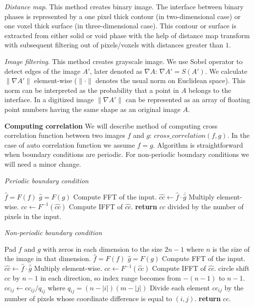 \documentclass[reprint,amsmath,amssymb,aps,pre]{revtex4-1}
\begin{document}
\textit{Distance map}.
This method creates binary image. 
The interface between binary phases is represented by a one
pixel thick contour (in two-dimensional case) or one voxel thick surface (in
three-dimensional case). This contour or surface is extracted from either solid
or void phase with the help of distance map transform with subsequent filtering
out of pixels/voxels with distances greater than $1$.

\textit{Image filtering}.
This method creates grayscale image. We use Sobel operator to detect edges of
the image $A'$, later denoted as $\nabla A$: $\nabla A' = S(A')$. We calculate
$\|\nabla A'\|$ element-wise ($\|\cdot\|$ denotes the usual norm on Euclidean
space). This norm can be interpreted as the probability that a point in $A$
belongs to the interface. In a digitized image $\|\nabla A'\|$ can be
represented as an array of floating point numbers having the same shape as an
original image $A$.

\textbf{Computing correlation}
We will describe method of computing cross correlation function between two
images $f$ and $g$: $cross\_correlation(f, g)$. In the case of auto correlation
function we assume $f = g$. Algorithm is straightforward when boundary
conditions are periodic. For non-periodic boundary conditions we will need a
minor change.

\textit{Periodic boundary condition}
\begin{algorithmic}[1]
  \State $\hat{f} = F(f)$
  \State $\hat{g} = F(g)$
  \Comment Compute FFT of the input.
  \State $\hat{cc} \gets \hat{f} \cdot \overline{\hat{g}}$
  \Comment Multiply element-wise.
  \State $cc \gets F^{-1}(\hat{cc})$
  \Comment Compute IFFT of $\hat{cc}$.
  \State \textbf{return} $cc$ divided by the number of pixels in the input.
  \EndProcedure
\end{algorithmic}

\textit{Non-periodic boundary condition}
\begin{algorithmic}[1]
  \State Pad $f$ and $g$ with zeros in each dimension to the size $2n-1$ where
  $n$ is the size of the image in that dimension.
  \State $\hat{f} = F(f)$
  \State $\hat{g} = F(g)$
  \Comment Compute FFT of the input.
  \State $\hat{cc} \gets \hat{f} \cdot \overline{\hat{g}}$
  \Comment Multiply element-wise.
  \State $cc \gets F^{-1}(\hat{cc})$
  \Comment Compute IFFT of $\hat{cc}$.
  \State circle shift $cc$ by $n - 1$ in each direction, so index range becomes
  from $-(n - 1)$ to $n - 1$.
  \State $cc_{ij} \gets cc_{ij} / q_{ij}$ where $q_{ij} = (n - |i|)(m - |j|)$
  \Comment Divide each element $cc_{ij}$ by the number of pixels whose
  coordinate difference is equal to $(i, j)$.
  \State \textbf{return} $cc$.
  \EndProcedure
\end{algorithmic}
\end{document}
